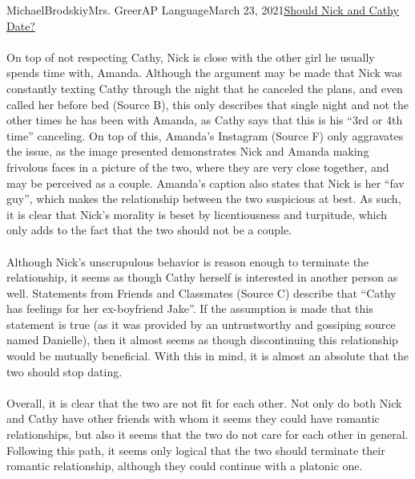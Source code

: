 \documentclass[12pt,letterpaper]{article}
\begin{document}
\begin{mla}{Michael}{Brodskiy}{Mrs. Greer}{AP Language}{March 23, 2021}{\underline{Should Nick and Cathy Date?}}
\begin{justify}
    \paragraph{} On top of not respecting Cathy, Nick is close with the other girl he usually spends time with, Amanda. Although the argument may be made that Nick was constantly texting Cathy through the night that he canceled the plans, and even called her before bed (Source B), this only describes that single night and not the other times he has been with Amanda, as Cathy says that this is his ``3rd or 4th time'' canceling. On top of this, Amanda's Instagram (Source F) only aggravates the issue, as the image presented demonstrates Nick and Amanda making frivolous faces in a picture of the two, where they are very close together, and may be perceived as a couple. Amanda's caption also states that Nick is her ``fav guy'', which makes the relationship between the two suspicious at best. As such, it is clear that Nick's morality is beset by licentiousness and turpitude, which only adds to the fact that the two should not be a couple. 

  \end{justify}

  \begin{justify}

    \paragraph{} Although Nick's unscrupulous behavior is reason enough to terminate the relationship, it seems as though Cathy herself is interested in another person as well. Statements from Friends and Classmates (Source C) describe that ``Cathy has feelings for her ex-boyfriend Jake''. If the assumption is made that this statement is true (as it was provided by an untrustworthy and gossiping source named Danielle), then it almost seems as though discontinuing this relationship would be mutually beneficial. With this in mind, it is almost an absolute that the two should stop dating.

  \end{justify}

  \begin{justify}

    \paragraph{} Overall, it is clear that the two are not fit for each other. Not only do both Nick and Cathy have other friends with whom it seems they could have romantic relationships, but also it seems that the two do not care for each other in general. Following this path, it seems only logical that the two should terminate their romantic relationship, although they could continue with a platonic one.

  \end{justify}


\end{mla}
\end{document}
